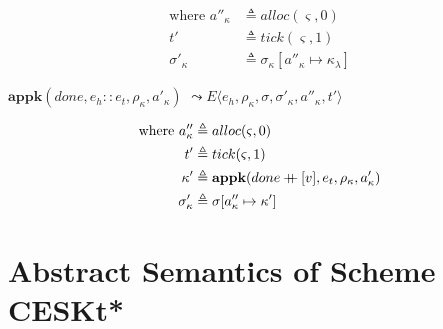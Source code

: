 \documentclass[12pt,draft]{article}
\newcommand\mdoubleplus{\ensuremath{\mathbin{+\mkern-9mu+}}}
\begin{document}
\begin{multicols*}{2}
\begin{center}
\end{center}
\vspace{-7mm}
\begin{align*}
  \text{where }
  a''_\kappa &\triangleq alloc(\varsigma, 0) \\
  t' &\triangleq tick(\varsigma, 1) \\
  \sigma'_\kappa &\triangleq \sigma_\kappa[a''_\kappa \mapsto \kappa_\lambda]
\end{align*}
\begin{center}
  $\textbf{appk}(done, e_h::e_t, \rho_\kappa, a'_\kappa)$
  $\leadsto E\langle e_h , \rho_\kappa , \sigma ,\sigma'_\kappa,a''_\kappa,t' \rangle$
\end{center}
\vspace{-7mm}
\begin{align*}
  \text{where }
  a''_\kappa &\triangleq alloc(\varsigma, 0) \\
  t' &\triangleq tick(\varsigma, 1) \\
  \kappa' &\triangleq \textbf{appk}(done \mdoubleplus [v] , e_t , \rho_\kappa , a'_\kappa) \\
  \sigma'_\kappa &\triangleq \sigma[a''_\kappa \mapsto \kappa']
\end{align*}
\end{multicols*}



\newpage
\section{Abstract Semantics of Scheme CESKt*}
\end{document}
